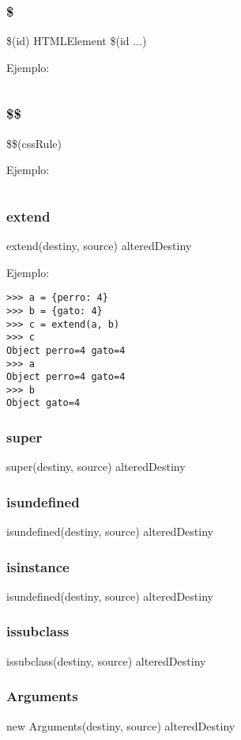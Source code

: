 \subsubsection*{\$}
\$(id) \rightarrow HTMLElement
\$(id ...) \rightarrow [HTMLElement...]

\noindent
Ejemplo:
\begin{lstlisting}[style=consola]
\end{lstlisting}

\subsubsection*{\$\$}
\$\$(cssRule) \rightarrow [HTMLElement...]

\noindent
Ejemplo:
\begin{lstlisting}[style=consola]
\end{lstlisting}

\subsubsection*{extend}
extend(destiny, source) \rightarrow alteredDestiny

\noindent
Ejemplo:
\begin{lstlisting}[style=consola]
>>> a = {perro: 4}
>>> b = {gato: 4}
>>> c = extend(a, b)
>>> c
Object perro=4 gato=4
>>> a
Object perro=4 gato=4
>>> b
Object gato=4
\end{lstlisting}

\subsubsection*{super}
super(destiny, source) \rightarrow alteredDestiny
\subsubsection*{isundefined}
isundefined(destiny, source) \rightarrow alteredDestiny
\subsubsection*{isinstance}
isundefined(destiny, source) \rightarrow alteredDestiny
\subsubsection*{issubclass}
issubclass(destiny, source) \rightarrow alteredDestiny
\subsubsection*{Arguments}
new Arguments(destiny, source) \rightarrow alteredDestiny

